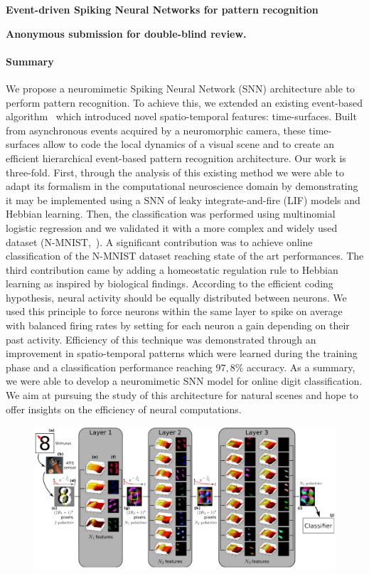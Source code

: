 \documentclass[12pt]{article}
\newcommand{\citet}[1]{\textcite{#1}}
\newcommand{\AuthorAG}{Antoine Grimaldi}
\newcommand{\AuthorLP}{Laurent Perrinet}
\newcommand{\AuthorVB}{Victor Boutin}
\newcommand{\AddressLP}{Institut de Neurosciences de la Timone (UMR 7289); Aix Marseille Univ, CNRS; Marseille, France}%
\newcommand{\AuthorSI}{Sio-Hoi Ieng}
\newcommand{\AuthorRB}{Ryad Benosman}%
\newcommand{\AddressRB}{Sorbonne Université, INSERM, CNRS, Institut de la Vision, France;}%
\newcommand{\Summary}{ %

We propose a neuromimetic Spiking Neural Network (SNN) architecture able to perform pattern recognition. %
To achieve this, we extended an existing event-based algorithm~\citet{Lagorce17} which introduced novel spatio-temporal features: time-surfaces. Built from asynchronous events acquired by a neuromorphic camera, these time-surfaces allow to code the local dynamics of a visual scene and to create an efficient hierarchical event-based pattern recognition architecture.
Our work is three-fold. First, through the analysis of this existing method we were able to adapt its formalism in the computational neuroscience domain by demonstrating it may be implemented using a SNN of leaky integrate-and-fire (LIF) models and Hebbian learning.
Then, the classification was performed using multinomial logistic regression %
and we validated it with a more complex and widely used dataset (N-MNIST,~\citet{Orchard15}).
A significant contribution was to achieve online classification of the N-MNIST dataset reaching state of the art performances. %
The third contribution came by adding a homeostatic regulation rule to Hebbian learning as inspired by biological findings.
 According to the efficient coding hypothesis, neural activity should be equally distributed between neurons. 
We used this principle to force neurons within the same layer to spike on average with balanced firing rates by setting for each neuron a gain depending on their past activity. Efficiency of this technique was demonstrated through an improvement in spatio-temporal patterns which were learned during the training phase and a classification performance reaching $97,8\%$ accuracy. As a summary, %
we were able to develop a neuromimetic SNN model for online digit classification. We aim at pursuing the study of this architecture for natural scenes and hope to offer insights on the efficiency of neural computations.
}
\begin{document}
{\Large\bf
Event-driven Spiking Neural Networks %
for
pattern recognition
}

{\bf
Anonymous submission for double-blind review.
}
%

\paragraph*{Summary}
\Summary
%
\begin{figure}
\vspace{-15pt}
\includegraphics[width=1.04\linewidth]{../notebooks/fig/hots.png}
\vspace{-45pt}
\caption*
{\label{fig:fig1}
}
\end{figure}
\end{document}
